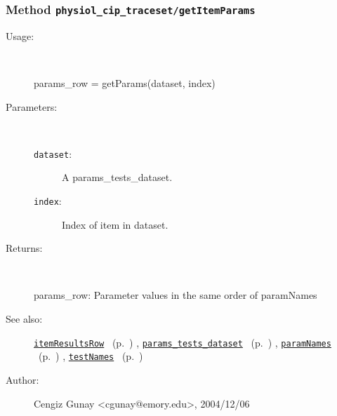 \subsubsection[Method \texttt{getItemParams}]{Method \texttt{physiol\_cip\_traceset/getItemParams}}%
%
\label{ref_physiol_cip_traceset__getItemParams}%
\hypertarget{ref_physiol_cip_traceset__getItemParams}{}%
\begin{description}
%
\item[Usage:]~%
\begin{lyxcode}%
params\_row = getParams(dataset, index)
%
\end{lyxcode}%
%
%
\item[Parameters:]~
\begin{description}%
\item[\texttt{dataset}:]
 A params\_tests\_dataset.
\item[\texttt{index}:]
 Index of item in dataset.
\end{description}%
%
\item[Returns:]~

	params\_row: Parameter values in the same order of paramNames
%
%
\item[See also:]%
\hyperlink{ref_itemResultsRow}{\texttt{itemResultsRow}}%
\ (p.~\pageref{ref_itemResultsRow})%
%
, \hyperlink{ref_params_tests_dataset}{\texttt{params\_tests\_dataset}}%
\ (p.~\pageref{ref_params_tests_dataset})%
%
, \hyperlink{ref_paramNames}{\texttt{paramNames}}%
\ (p.~\pageref{ref_paramNames})%
%
, \hyperlink{ref_testNames}{\texttt{testNames}}%
\ (p.~\pageref{ref_testNames})%
%
%
\item[Author:]%
Cengiz Gunay <cgunay@emory.edu>, 2004/12/06%
\end{description}
\methodline%
